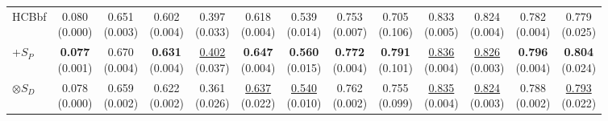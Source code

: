 \documentclass[conference,a4paper]{APSIPA2025}
\begin{document}
\begin{table}[h!]
{\begin{tabular}{l|cc|cccc|cccccc}
\midrule 
HCBbf & \makecell{0.080 \\ (0.000)} & \makecell{0.651 \\ (0.003)} & \makecell{0.602 \\ (0.004)} & \makecell{0.397 \\ (0.033)} & \makecell{0.618 \\ (0.004)} & \makecell{0.539 \\ (0.014)} & \makecell{0.753 \\ (0.007)} & \makecell{0.705 \\ (0.106)} & \makecell{0.833 \\ (0.005)} & \makecell{0.824 \\ (0.004)} & \makecell{0.782 \\ (0.004)} & \makecell{0.779 \\ (0.025)} \\
\hspace{2px}+$S_{P}$ & \makecell{\textbf{0.077} \\ (0.001)} & \makecell{0.670 \\ (0.004)} & \makecell{\textbf{0.631} \\ (0.004)} & \makecell{\underline{0.402} \\ (0.037)} & \makecell{\textbf{0.647} \\ (0.004)} & \makecell{\textbf{0.560} \\ (0.015)} & \makecell{\textbf{0.772} \\ (0.004)} & \makecell{\textbf{0.791} \\ (0.101)} & \makecell{\underline{0.836} \\ (0.004)} & \makecell{\underline{0.826} \\ (0.003)} & \makecell{\textbf{0.796} \\ (0.004)} & \makecell{\textbf{0.804}
 \\ (0.024)} \\
\hspace{4px}$\otimes S_{D}$\cite{fu23_interspeech} & \makecell{0.078 \\ (0.000)} & \makecell{0.659 \\ (0.002)} & \makecell{0.622 \\ (0.002)} & \makecell{0.361 \\ (0.026)} & \makecell{\underline{0.637} \\ (0.022)} & \makecell{\underline{0.540} \\ (0.010)} & \makecell{0.762 \\ (0.002)} & \makecell{0.755 \\ (0.099)} & \makecell{\underline{0.835} \\ (0.004)} & \makecell{\underline{0.824} \\ (0.003)} & \makecell{0.788 \\ (0.002)} & \makecell{\underline{0.793} \\ (0.022)} \\

\end{tabular}}
\end{table}
\end{document}
